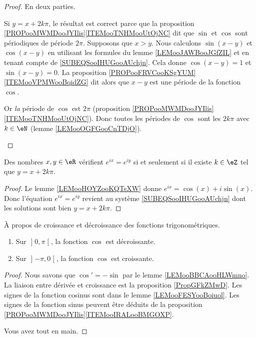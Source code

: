 \begin{proof}
	En deux parties.
	\begin{subproof}
		\spitem[\(  \Leftarrow\)]
		Si \( y=x+2k\pi\), le résultat est correct parce que la proposition \ref{PROPooMWMDooJYIlis}\ref{ITEMooTNHMooUtOjNC} dit que \( \sin\) et \( \cos\) sont périodiques de période \( 2\pi\).
		\spitem[\(  \Rightarrow\)]
		Supposons que \( x>y\). Nous calculons \( \sin(x-y)\) et \( \cos(x-y)\) en utilisant les formules du lemme \ref{LEMooJAWBooJGfZIL} et en tenant compte de \eqref{SUBEQSooIHUGooAUchjn}. Cela donne \( \cos(x-y)=1\) et \( \sin(x-y)=0\). La proposition \ref{PROPooFRVCooKSgYUM}\ref{ITEMooVPMWooBqidZG} dit alors que \( x-y\) est une période de la fonction \( \cos\).

		Or \emph{la} période de \( \cos\) est \( 2\pi\) (proposition \ref{PROPooMWMDooJYIlis}\ref{ITEMooTNHMooUtOjNC}). Donc toutes les périodes de \( \cos\) sont les \( 2k\pi\) avec \( k\in \eN\) (lemme \ref{LEMooOGFGooCnTDjO}).
	\end{subproof}
\end{proof}

\begin{corollary}   \label{CORooTFMAooHDRrqi}
	Des nombres \( x,y\in \eR\) vérifient \(  e^{ix}= e^{iy}\) si et seulement si il existe \( k\in\eZ\) tel que \( y=x+2k\pi\).
\end{corollary}

\begin{proof}
	Le lemme \ref{LEMooHOYZooKQTsXW} donne \(  e^{ix}=\cos(x)+i\sin(x)\). Donc l'équation \(  e^{ix}= e^{iy}\) revient au système \eqref{SUBEQSooIHUGooAUchjn} dont les solutions sont bien \( y=x+2k\pi\).
\end{proof}

\begin{lemma}        \label{LEMooBIPFooQNiTqZ}
	À propos de croissance et décroissance des fonctions trigonométriques.
	\begin{enumerate}
		\item
		      Sur \( \mathopen] 0 , \pi \mathclose[\), la fonction \( \cos\) est décroissante.
		\item
		      Sur \( \mathopen] -\pi , 0 \mathclose[\), la fonction \( \cos\) est croissante.
	\end{enumerate}
\end{lemma}

\begin{proof}
	Nous savons que \( \cos'=-\sin\) par le lemme \ref{LEMooBBCAooHLWmno}. La liaison entre dérivée et croissance est la proposition \ref{PropGFkZMwD}. Les signes de la fonction cosinus sont dans le lemme \ref{LEMooFESYooBoiuol}. Les signes de la fonction sinus peuvent être déduits de la proposition \ref{PROPooMWMDooJYIlis}\ref{ITEMooIRALooBMGOXP}.

	Vous avez tout en main.
\end{proof}


